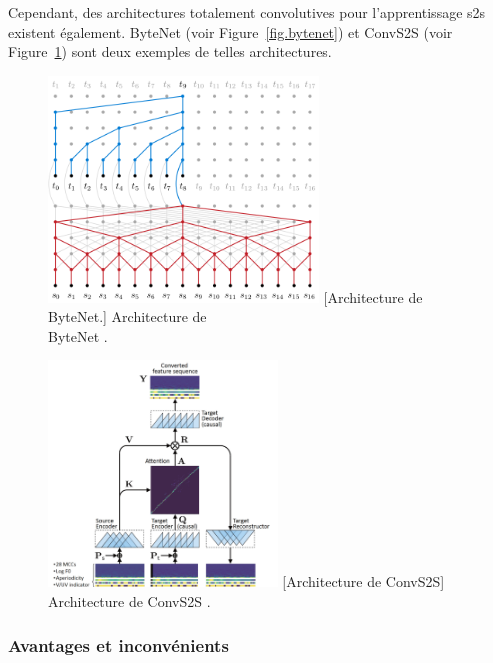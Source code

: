 Cependant, des architectures totalement convolutives pour l'apprentissage \gls{s2s} existent également.
ByteNet (voir Figure~\ref{fig.bytenet})
et ConvS2S (voir Figure~\ref{fig.convs2s}) sont deux exemples de telles architectures.

\begin{figure}[H]
    \centering
    \begin{minipage}{.5\linewidth}
        \centering
        \includegraphics[height=6cm]{assets/images/bytenet.png}
        [Architecture de ByteNet.]%
        {Architecture de\\ByteNet \cite{Kalchbrenner_Espeholt_Simonyan_Oord_Graves_Kavukcuoglu_2017}.}
        \label{fig.bytenet}
    \end{minipage}%
    \begin{minipage}{.4\linewidth}
        \centering
        \includegraphics[height=6cm]{assets/images/convs2s.png}
        [Architecture de ConvS2S]%
        {Architecture de ConvS2S \cite{Kameoka_Tanaka_Kwaśny_Kaneko_Hojo_2020}.}
        \label{fig.convs2s}
    \end{minipage}
\end{figure}


\subsubsection{Avantages et inconvénients}

